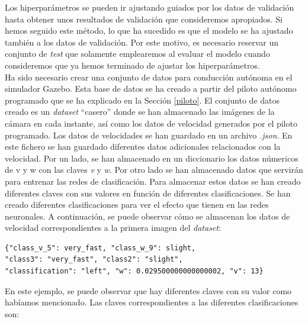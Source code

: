 Los hiperparámetros se pueden ir ajustando guiados por los datos de validación hasta obtener unos resultados de validación que consideremos apropiados. Si hemos seguido este método, lo que ha sucedido es que el modelo se ha ajustado también a los datos de validación. Por este motivo, es necesario reservar un conjunto de \textit{test} que solamente emplearemos al evaluar el modelo cuando consideremos que ya hemos terminado de ajustar los hiperparámetros.\\

Ha sido necesario crear una conjunto de datos para conducción autónoma en el simulador Gazebo. Esta base de datos se ha creado a partir del piloto autónomo programado que se ha explicado en la Sección \ref{piloto}. El conjunto de datos creado es un \textit{dataset} ``casero'' donde se han almacenado las imágenes de la cámara en cada instante, así como los datos de velocidad generados por el piloto programado. Los datos de velocidades se han guardado en un archivo \textit{.json}. En este fichero se han guardado diferentes datos adicionales relacionados con la velocidad. Por un lado, se han almacenado en un diccionario los datos númericos de v y w con las claves \textit{v} y \textit{w}. Por otro lado se han almacenado datos que servirán para entrenar las redes de clasificación. Para almacenar estos datos se han creado diferentes claves con sus valores en función de diferentes clasificaciones. Se han creado diferentes clasificaciones para ver el efecto que tienen en las redes neuronales. A continuación, se puede observar cómo se almacenan los datos de velocidad correspondientes a la primera imagen del \textit{dataset}:\\

\begin{lstlisting}
{"class_v_5": very_fast, "class_w_9": slight, 
"class3": "very_fast", "class2": "slight", 
"classification": "left", "w": 0.029500000000000002, "v": 13}
\end{lstlisting}
\vspace{20pt}

En este ejemplo, se puede observar que hay diferentes claves con su valor como habíamos mencionado. Las claves correspondientes a las diferentes clasificaciones son:

